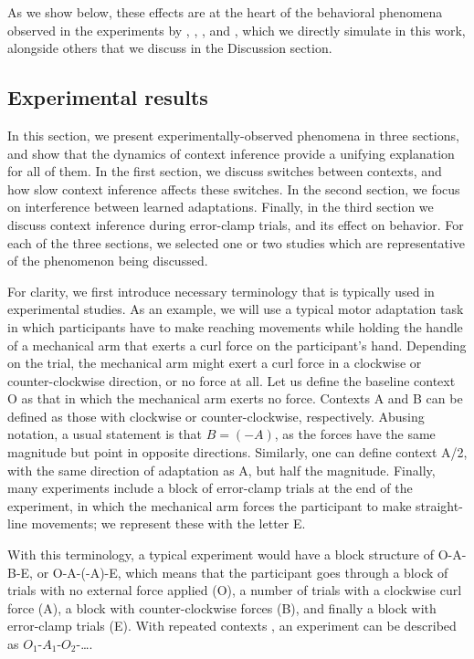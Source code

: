 \documentclass[a4paper,doc,floatsintext,natbib]{apa6}
\begin{document}
As we show below, these effects are at the heart of the behavioral phenomena observed in the experiments by \cite{Kim_Neural_2015}, \cite{Oh_Minimizing_2019}, \cite{Davidson_Scaling_2004}, and \cite{Vaswani_Decay_2013}, which we directly simulate in this work, alongside others that we discuss in the Discussion section.



\subsection{Experimental results}
In this section, we present experimentally-observed phenomena in three sections, and show that the dynamics of context inference provide a unifying explanation for all of them. In the first section, we discuss switches between contexts, and how slow context inference affects these switches. In the second section, we focus on interference between learned adaptations. Finally, in the third section we discuss context inference during error-clamp trials, and its effect on behavior. For each of the three sections, we selected one or two studies which are representative of the phenomenon being discussed.

For clarity, we first introduce necessary terminology that is typically used in experimental studies. As an example, we will use a typical motor adaptation task in which participants have to make reaching movements while holding the handle of a mechanical arm that exerts a curl force on the participant's hand. Depending on the trial, the mechanical arm might exert a curl force in a clockwise or counter-clockwise direction, or no force at all. Let us define the baseline context O as that in which the mechanical arm exerts no force. Contexts A and B can be defined as those with clockwise or counter-clockwise, respectively. Abusing notation, a usual statement is that $B = (-A)$, as the forces have the same magnitude but point in opposite directions. Similarly, one can define context A/2, with the same direction of adaptation as A, but half the magnitude. Finally, many experiments include a block of error-clamp trials at the end of the experiment, in which the mechanical arm forces the participant to make straight-line movements; we represent these with the letter E.

With this terminology, a typical experiment \cite[e.g.][]{Ethier_Spontaneous_2008} would have a block structure of O-A-B-E, or O-A-(-A)-E, which means that the participant goes through a block of trials with no external force applied (O), a number of trials with a clockwise curl force (A), a block with counter-clockwise forces (B), and finally a block with error-clamp trials (E). With repeated contexts \citep[e.g.][]{Oh_Minimizing_2019}, an experiment can be described as $O_1$-$A_1$-$O_2$-\ldots .
\end{document}
